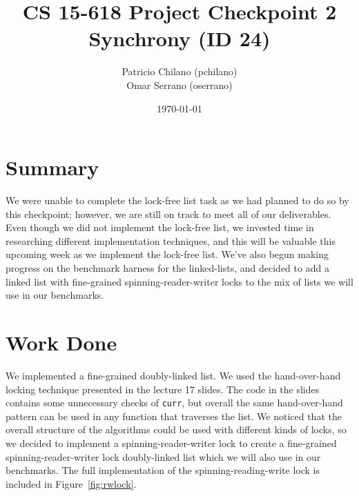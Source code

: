 \documentclass[11pt]{article}
\title{\vspace{-25pt}
\huge CS 15-618 Project Checkpoint 2 \\
\huge Synchrony (ID 24)
}
\author{
    Patricio Chilano (pchilano) \\
    Omar Serrano (oserrano)
}
\date{\today}
\begin{document}


\maketitle

\section*{Summary}
We were unable to complete the lock-free list task as we had planned to do so by
this checkpoint; however, we are still on track to meet all of our deliverables.
Even though we did not implement the lock-free list, we invested time in
researching different implementation techniques, and this will be valuable this
upcoming week as we implement the lock-free list. We've also begun making
progress on the benchmark harness for the linked-lists, and decided to add a
linked list with fine-grained spinning-reader-writer locks to the mix of lists
we will use in our benchmarks.

\section*{Work Done}
We implemented a fine-grained doubly-linked list. We used the hand-over-hand
locking technique presented in the lecture 17 slides. The code in the slides
contains some unnecessary checks of {\tt curr}, but overall the same
hand-over-hand pattern can be used in any function that traverses the list. We
noticed that the overall structure of the algorithms could be used with
different kinds of locks, so we decided to implement a spinning-reader-writer
lock to create a fine-grained spinning-reader-writer lock doubly-linked list
which we will also use in our benchmarks. The full implementation of the
spinning-reading-write lock is included in Figure~\ref{fig:rwlock}.
\end{document}
